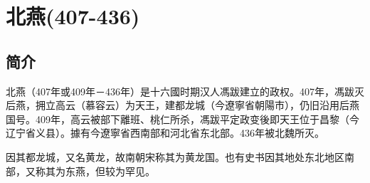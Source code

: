 

\section{北燕\tiny(407-436)}

\subsection{简介}

北燕（407年或409年－436年）是十六國时期汉人馮跋建立的政权。407年，馮跋灭后燕，拥立高云（慕容云）为天王，建都龙城（今遼寧省朝陽市），仍旧沿用后燕国号。409年，高云被部下離班、桃仁所杀，馮跋平定政变後即天王位于昌黎（今辽宁省义县）。據有今遼寧省西南部和河北省东北部。436年被北魏所灭。

因其都龙城，又名黄龙，故南朝宋称其为黄龙国。也有史书因其地处东北地区南部，又称其为东燕，但较为罕见。






